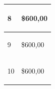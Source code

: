 \begin{spacing}{0.1}
\begin{center}
\begin{tabular}{ |p{3.5cm}| p{3cm}|}
\begin{center}8 \end{center}    & \begin{center} \$600,00 \end{center} \\ \hline

\begin{center}9 \end{center}    & \begin{center} \$600,00 \end{center} \\ \hline

\begin{center}10 \end{center}    & \begin{center} \$600,00 \end{center} \\ \hline

\end{tabular}
\end{center}
\end{spacing}
\\

